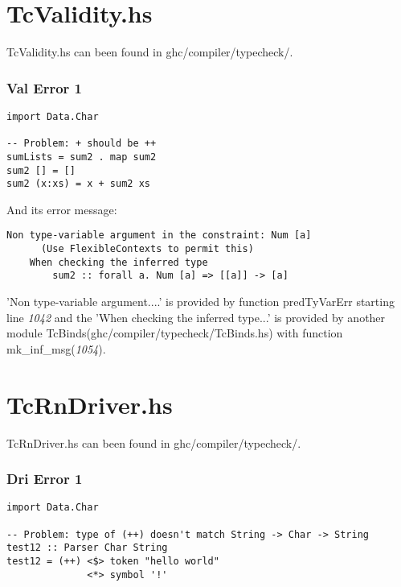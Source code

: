 \documentclass[a4paper]{article}
\begin{document}
\section{TcValidity.hs}

TcValidity.hs can been found in ghc/compiler/typecheck/. 

\subsubsection{Val Error 1}

\begin{lstlisting}[label={lst: T22.0}, numbers=none, caption={Example Program \cite{ce1}}]
import Data.Char

-- Problem: + should be ++
sumLists = sum2 . map sum2                       
sum2 [] = []
sum2 (x:xs) = x + sum2 xs
\end{lstlisting}

And its error message:
\hfill \break
\hfill \break
\begin{lstlisting}[label={lst: T22.0.2}, numbers=none, caption={Error}]
Non type-variable argument in the constraint: Num [a]
      (Use FlexibleContexts to permit this)
    When checking the inferred type
        sum2 :: forall a. Num [a] => [[a]] -> [a]
\end{lstlisting}

'Non type-variable argument....' is provided by function predTyVarErr starting line \textit{1042} and the 'When checking the inferred type...' is provided by another module TcBinds(ghc/compiler/typecheck/TcBinds.hs) with function mk\_inf\_msg(\textit{1054}).


\section{TcRnDriver.hs}

TcRnDriver.hs can been found in ghc/compiler/typecheck/. 

\subsubsection{Dri Error 1}

\begin{lstlisting}[label={lst: T23.0}, numbers=none, caption={Example Program \cite{ce1}}]
import Data.Char

-- Problem: type of (++) doesn't match String -> Char -> String
test12 :: Parser Char String                        
test12 = (++) <$> token "hello world"
              <*> symbol '!'
\end{lstlisting}
\end{document}
